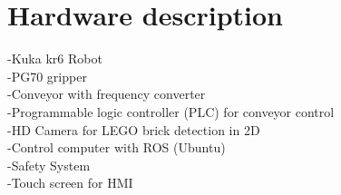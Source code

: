 \section{Hardware description}
\label{sec:rc_hardware}
-Kuka kr6 Robot \\
-PG70 gripper\\
-Conveyor with frequency converter\\
-Programmable logic controller (PLC) for conveyor control\\
-HD Camera for LEGO brick detection in 2D\\
-Control computer with ROS (Ubuntu)\\
-Safety System\\
-Touch screen for HMI\\